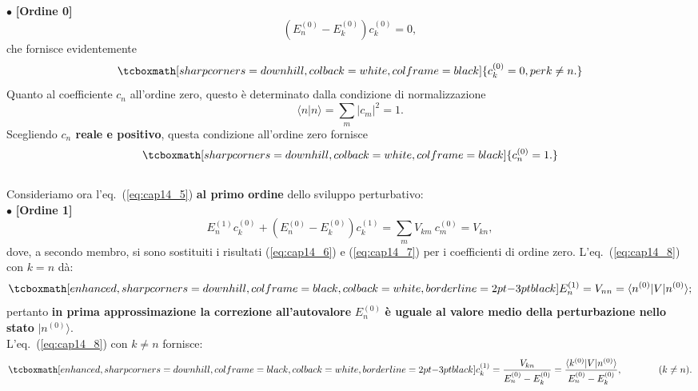 $\bullet$ \textbf{[Ordine 0]}\\
	\begin{equation}
		\left(E_n ^{(0)}- E_k ^{(0)}\right)c_k ^{(0)}=0,
	\end{equation}
che fornisce evidentemente
	\begin{equation}
		\tcboxmath[sharp corners=downhill, colback=white, colframe=black]{	
			c_k ^{(0)}=0, per k\neq n.
			}
	\label{eq:cap14_6}
	\end{equation}
Quanto al coefficiente $c_n$ all'ordine zero, questo è determinato dalla condizione di normalizzazione
	\begin{equation}
		\langle n \vert n \rangle = \sum _m \vert c_m \vert ^2 =1.
	\end{equation}
Scegliendo \textbf{$c_n$ reale e positivo}, questa condizione all'ordine zero fornisce
	\begin{equation}
		\tcboxmath[sharp corners=downhill, colback=white, colframe=black]{
			c_n ^{(0)}=1.
			}
	\label{eq:cap14_7}
	\end{equation}\\
	
Consideriamo ora l'eq.~(\ref{eq:cap14_5}) \textbf{al primo ordine} dello sviluppo perturbativo:\\

$\bullet$ \textbf{[Ordine 1]}\\
	\begin{equation}
		E_n ^{(1)}c_k ^{(0)}+\left(E_n ^{(0)}- E_k ^{(0)}\right)c_k ^{(1)}=\sum _m V_{km}\ c_m ^{(0)} = V_{kn},
	\label{eq:cap14_8}
	\end{equation}
dove, a secondo membro, si sono sostituiti i risultati (\ref{eq:cap14_6}) e (\ref{eq:cap14_7}) per i coefficienti di ordine zero. L'eq.~(\ref{eq:cap14_8}) con $k=n$ dà:
	\begin{equation}
		\tcboxmath[enhanced, sharp corners=downhill, colframe=black, colback=white, borderline={2pt}{-3pt}{black}]{
			E_n  ^{(1)} = V_{nn} = \langle n^{(0)}\vert V \vert n^{(0)} \rangle ;
			}
	\end{equation}
pertanto \textbf{in prima approssimazione la correzione all'autovalore} $E_n ^{(0)}$ \textbf{è uguale al valore medio della perturbazione nello stato} $\vert n^{(0)} \rangle$.\\

L'eq.~(\ref{eq:cap14_8})  con $k\neq n$ fornisce:
	\begin{equation}
		\tcboxmath[enhanced, sharp corners=downhill, colframe=black, colback=white, borderline={2pt}{-3pt}{black}]{
			c_k ^{(1)} = \frac{V_{kn}}{E_n ^{(0)}-E_k ^{(0)}}=\frac{\langle k^{(0)}\vert V \vert n^{(0)} \rangle}{E_n ^{(0)}-E_k ^{(0)}}, }\qquad \qquad (k\neq n).			
	\label{eq:cap14_9}
	\end{equation}\\
	  
